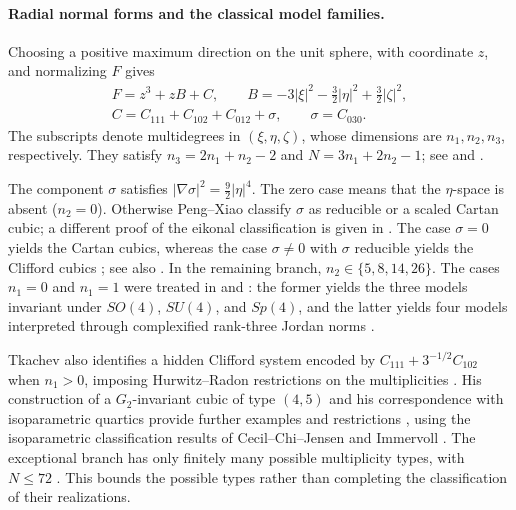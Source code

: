 \paragraph{Radial normal forms and the classical model families.}
\label{rem:cubic-radial-normal-form-history}
Choosing a positive maximum direction on the unit sphere, with
coordinate $z$, and normalizing $F$ gives
\[
 \begin{gathered}
 F=z^3+zB+C,\qquad
 B=-3|\xi|^2-\tfrac32|\eta|^2+\tfrac32|\zeta|^2,\\
 C=C_{111}+C_{102}+C_{012}+\sigma,\qquad \sigma=C_{030}.
 \end{gathered}
\]
The subscripts denote multidegrees in $(\xi,\eta,\zeta)$, whose
dimensions are $n_1,n_2,n_3$, respectively. They satisfy
$n_3=2n_1+n_2-2$ and
$N=3n_1+2n_2-1$; see \cite[Section~1, Theorem~1]{PengXiao93}
and \cite[Proposition~3.1]{TkachevClassification10}.

The component $\sigma$ satisfies
$|\nabla\sigma|^2=\tfrac92|\eta|^4$.
The zero case means that the $\eta$-space is absent ($n_2=0$).
Otherwise Peng--Xiao \cite[Theorem~2]{PengXiao93} classify $\sigma$
as reducible or a scaled Cartan cubic; a different proof of the
eikonal classification is given in
\cite[Theorem~1.1]{TkachevCartan10}.
The case $\sigma=0$ yields the Cartan cubics, whereas the case
$\sigma\ne0$ with $\sigma$ reducible yields the Clifford cubics
\cite[Theorems~A and~B]{PengXiao93}; see also
\cite[Proposition~3.4 and Theorem~3]{TkachevClassification10}.
In the remaining branch, $n_2\in\{5,8,14,26\}$.
The cases $n_1=0$ and $n_1=1$ were treated in
\cite[Theorems~C and~D]{PengXiao93} and
\cite[Sections~6.2--6.3]{TkachevClassification10}:
the former yields the three models invariant under $SO(4)$, $SU(4)$,
and $Sp(4)$, and the latter yields four models interpreted through
complexified rank-three Jordan norms
\cite[Section~6.11.6(iii)--(iv)]{NadirashviliTkachevVladut14}.

Tkachev also identifies a hidden Clifford system encoded by
$C_{111}+3^{-1/2}C_{102}$ when $n_1>0$, imposing Hurwitz--Radon restrictions on the
multiplicities \cite[Proposition~3.3]{TkachevClassification10}.
His construction of a $G_2$-invariant cubic of type $(4,5)$ and his
correspondence with isoparametric quartics provide further examples and
restrictions \cite[Section~6.4 and Theorem~5]{TkachevClassification10},
using the isoparametric classification results of
Cecil--Chi--Jensen \cite{CecilChiJensen07} and Immervoll
\cite{Immervoll08}. The exceptional branch has only finitely many
possible multiplicity types, with $N\le72$
\cite[Theorem~6.11.2]{NadirashviliTkachevVladut14}.
This bounds the possible types rather than completing the
classification of their realizations.

